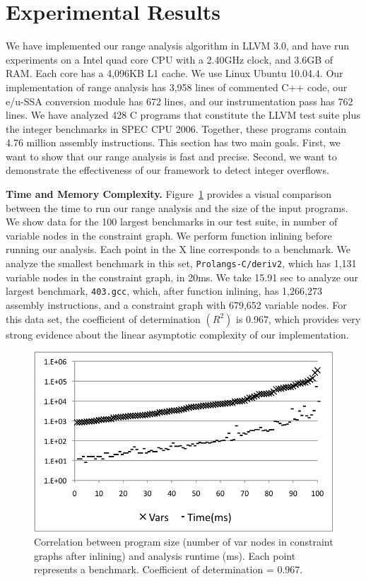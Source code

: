 \documentclass[preprint]{sigplanconf}[10pt]
\begin{document}
\section{Experimental Results}
\label{sec:exp}

We have implemented our range analysis algorithm in LLVM 3.0, and have run
experiments on a Intel quad core CPU with a 2.40GHz clock, and 3.6GB of RAM.
Each core has a 4,096KB L1 cache.
We use Linux Ubuntu 10.04.4.
Our implementation of range analysis has 3,958 lines of
commented C++ code, our e/u-SSA conversion module has 672 lines, and our
instrumentation pass has 762 lines.
We have analyzed 428 C programs that constitute the LLVM test suite plus the
integer benchmarks in SPEC CPU 2006.
Together, these programs contain 4.76 million assembly instructions.
This section has two main goals.
First, we want to show that our range analysis is fast and precise.
Second, we want to demonstrate the effectiveness of our framework to detect
integer overflows.

\noindent
\textbf{Time and Memory Complexity.}
Figure~\ref{fig:TimeCorr} provides a visual comparison between the time to
run our range analysis and the size of the input programs.
We show data for the 100 largest benchmarks in our test suite, in number
of variable nodes in the constraint graph.
We perform function inlining before running our analysis.
Each point in the X line corresponds to a benchmark.
We analyze the smallest benchmark in this set, \texttt{Prolangs-C/deriv2}, which
has 1,131 variable nodes in the constraint graph, in 20ms.
We take 15.91 sec to analyze our largest benchmark, \texttt{403.gcc}, which,
after function inlining, has 1,266,273 assembly instructions, and a
constraint graph with 679,652 variable nodes.
For this data set, the coefficient of determination $(R^2)$ is 0.967, which
provides very strong evidence about the linear asymptotic complexity of our
implementation.

\begin{figure}[t!]
\begin{center}
\includegraphics[width=\columnwidth]{images/TimeCorr}
\end{center}
\caption{\label{fig:TimeCorr}
Correlation between program size (number of var nodes in constraint
graphs after inlining) and analysis runtime (ms).
Each point represents a benchmark.
Coefficient of determination = 0.967.
}
\end{figure}
\end{document}
